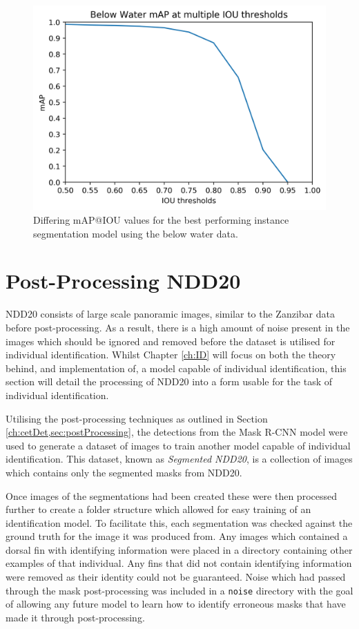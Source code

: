 \begin{figure}
	\begin{center}
		\includegraphics[scale=0.7]{Chapter4/figs/bw-mAP-IOU.png}
	\end{center}
	\caption{Differing mAP@IOU values for the best performing instance segmentation model using the below water data.}
	\label{fig:bw-mAP-IOU}
\end{figure}

\section{Post-Processing NDD20}\label{ch:NDD,sec:postProcessingNDD20}

NDD20 consists of large scale panoramic images, similar to the Zanzibar data before post-processing. As a result, there is a high amount of noise present in the images which should be ignored and removed before the dataset is utilised for individual identification. Whilst Chapter \ref{ch:ID} will focus on both the theory behind, and implementation of, a model capable of individual identification, this section will detail the processing of NDD20 into a form usable for the task of individual identification.

Utilising the post-processing techniques as outlined in Section \ref{ch:cetDet,sec:postProcessing}, the detections from the Mask R-CNN model were used to generate a dataset of images to train another model capable of individual identification. This dataset, known as \textit{Segmented NDD20}, is a collection of images which contains only the segmented masks from NDD20. 

Once images of the segmentations had been created these were then processed further to create a folder structure which allowed for easy training of an identification model. To facilitate this, each segmentation was checked against the ground truth for the image it was produced from. Any images which contained a dorsal fin with identifying information were placed in a directory containing other examples of that individual. Any fins that did not contain identifying information were removed as their identity could not be guaranteed. Noise which had passed through the mask post-processing was included in a \texttt{noise} directory with the goal of allowing any future model to learn how to identify erroneous masks that have made it through post-processing. 

